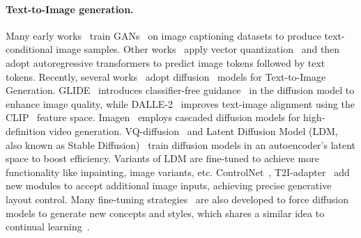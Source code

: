 \documentclass{article}
\begin{document}
\paragraph{Text-to-Image generation.}
Many early works~\cite{zhu2019dm,zhang2021cross,ye2021improving,xu2018attngan,tao2020df} train GANs~\cite{goodfellow2020generative} on image captioning datasets to produce text-conditional image samples. Other works~\cite{ramesh2021zero, yu2022scaling, yu2021vector, ding2022cogview2, gafni2022make} apply vector quantization~\cite{van2017neural} and then adopt autoregressive transformers to predict image tokens followed by text tokens.  Recently, several works~\cite{nichol2021glide, saharia2022photorealistic, gu2022vector, rombach2022high} adopt diffusion~\cite{ho2020denoising} models for Text-to-Image Generation. GLIDE~\cite{nichol2021glide} introduces classifier-free guidance~\cite{ho2022classifier} in the diffusion model to enhance image quality, while DALLE-2~\cite{ramesh2022hierarchical} improves text-image alignment using the CLIP~\cite{radford2021learning} feature space. Imagen~\cite{saharia2022photorealistic} employs cascaded diffusion models for high-definition video generation. VQ-diffusion~\cite{gu2022vector} and Latent Diffusion Model (LDM, also known as Stable Diffusion)~\cite{rombach2022high} train diffusion models in an autoencoder's latent space to boost efficiency. Variants of LDM are fine-tuned to achieve more functionality like inpainting, image variants, etc. ControlNet~\cite{zhang2023adding}, T2I-adapter~\cite{mou2023t2i} add new modules to accept additional image inputs, achieving precise generative layout control. Many fine-tuning strategies~\cite{ruiz2022dreambooth,hu2021lora,gal2022image} are also developed to force diffusion models to generate new concepts and styles, which shares a similar idea to continual learning~\cite{zhou2021pycil,wang2022foster,smith2023continual}.
\end{document}
